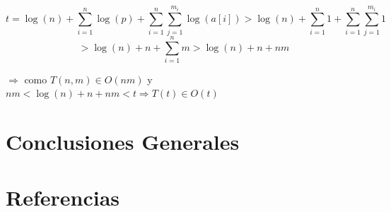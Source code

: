 \documentclass[a4paper,11pt] {article}
\begin{document}
$$t=\log(n)+\sum_{i=1}^{n}\log(p)+\sum_{i=1}^{n}\sum_{j=1}^{m_i}\log(a[i])>\log(n)+\sum_{i=1}^{n}1+\sum_{i=1}^{n}\sum_{j=1}^{m_i}1$$
$$>\log(n)+n+\sum_{i=1}^{n}m>\log(n)+n+nm$$

\hspace{20pt} $\Longrightarrow$ como $T(n,m) \in O(nm)$ y $nm<\log(n)+n+nm<t \Longrightarrow T(t) \in O(t)$

\section{Conclusiones Generales}

\section*{Referencias}
\end{document}
